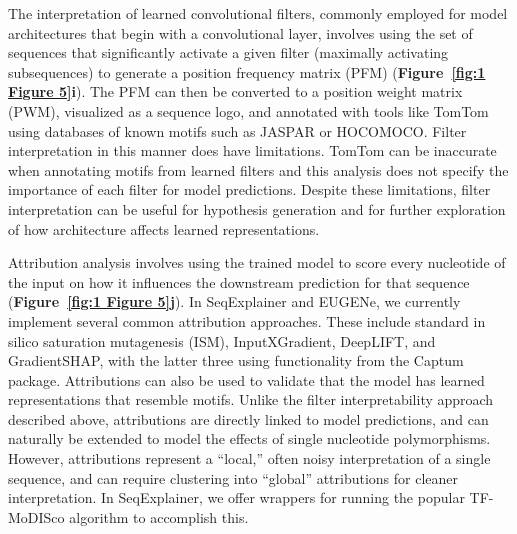 The interpretation of learned convolutional filters, commonly employed for model architectures that begin with a convolutional layer, involves using the set of sequences that significantly activate a given filter (maximally activating subsequences) to generate a position frequency matrix (PFM) (\textbf{Figure~\ref{fig:1 Figure 5}\textbf{i}}). The PFM can then be converted to a position weight matrix (PWM), visualized as a sequence logo, and annotated with tools like TomTom\cite{Gupta2007-zw} using databases of known motifs such as JASPAR\cite{Castro-Mondragon2022-kx} or HOCOMOCO\cite{Kulakovskiy2018-oz}. Filter interpretation in this manner does have limitations. TomTom can be inaccurate when annotating motifs from learned filters\cite{Ullah2021-th,Koo2019-fb} and this analysis does not specify the importance of each filter for model predictions\cite{Koo2019-fb}. Despite these limitations, filter interpretation can be useful for hypothesis generation and for further exploration of how architecture affects learned representations\cite{Koo2019-fb,Koo2021-gs,Ploenzke2018-ng}.

Attribution analysis involves using the trained model to score every nucleotide of the input on how it influences the downstream prediction for that sequence (\textbf{Figure~\ref{fig:1 Figure 5}\textbf{j}}). In SeqExplainer and EUGENe, we currently implement several common attribution approaches. These include standard in silico saturation mutagenesis (ISM), InputXGradient\cite{Shrikumar2016-lf}, DeepLIFT\cite{Shrikumar2016-lf}, and GradientSHAP\cite{Lundberg2017-hh}, with the latter three using functionality from the Captum package\cite{Kokhlikyan2020-mv}. Attributions can also be used to validate that the model has learned representations that resemble motifs. Unlike the filter interpretability approach described above, attributions are directly linked to model predictions, and can naturally be extended to model the effects of single nucleotide polymorphisms. However, attributions represent a “local,” often noisy\cite{Han2022-pi,Majdandzic2022-eu} interpretation of a single sequence, and can require clustering into “global” attributions for cleaner interpretation. In SeqExplainer, we offer wrappers for running the popular TF-MoDISco algorithm\cite{Shrikumar2018-sb} to accomplish this.

